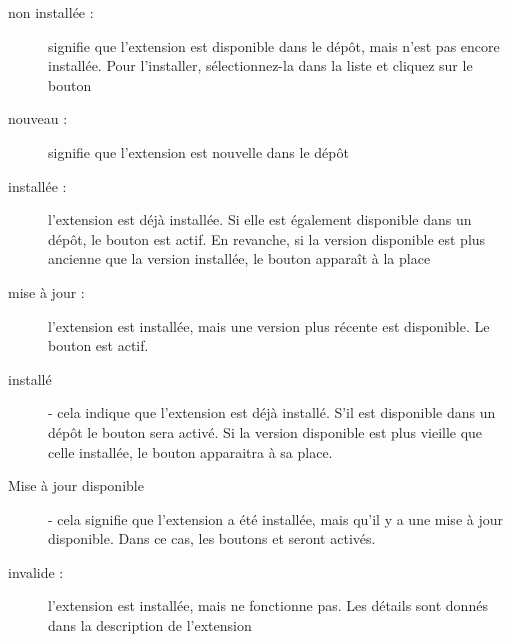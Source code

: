 \begin{description}
\item[non installée :]signifie que l'extension est disponible dans le dépôt, 
mais n'est pas encore installée. Pour l'installer, sélectionnez-la dans la 
liste et cliquez sur le bouton\\ 
\item[nouveau :] signifie que l'extension est nouvelle dans le dépôt
\item[installée :] l'extension est déjà installée. Si elle est également 
disponible dans un dépôt, le bouton  est 
actif. En revanche, si la version disponible est plus ancienne que la 
version installée, le bouton  apparaît à 
la place
\item[mise à jour :] l'extension est installée, mais une version plus 
récente est disponible. Le bouton  
est actif.
\item[installé] - cela indique que l'extension est déjà installé. S'il est 
disponible dans un dépôt le bouton  sera 
activé. Si la version disponible est plus vieille que celle installée, le 
bouton  apparaitra à 
sa place.
\item[Mise à jour disponible] - cela signifie que l'extension a été 
installée, mais qu'il y a une mise à jour disponible. Dans ce cas, les 
boutons  et  
seront activés.

\item[invalide :] l'extension est installée, mais ne fonctionne pas. Les 
détails sont donnés dans la description de l'extension
\end{description}

